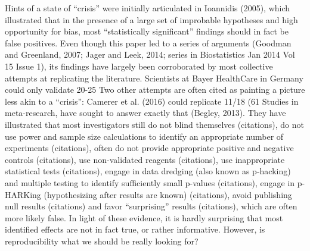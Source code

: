 \documentclass[12pt]{article}
\begin{document}
Hints of a state of “crisis” were initially articulated in Ioannidis (2005), which illustrated that in the presence of a large set of improbable hypotheses and high opportunity for bias, most “statistically significant” findings should in fact be false positives. Even though this paper led to a series of arguments (Goodman and Greenland, 2007; Jager and Leek, 2014; series in Biostatistics Jan 2014 Vol 15 Issue 1), its findings have largely been corroborated by most collective attempts at replicating the literature.
Scientists at Bayer HealthCare in Germany could only validate 20-25%
Two other attempts are often cited as painting a picture less akin to a “crisis”: Camerer et al. (2016) could replicate 11/18 (61%
Studies in meta-research, have sought to answer exactly that (Begley, 2013). They have illustrated that most investigators still do not blind themselves (citations), do not use power and sample size calculations to identify an appropriate number of experiments (citations), often do not provide appropriate positive and negative controls (citations), use non-validated reagents (citations), use inappropriate statistical tests (citations), engage in data dredging (also known as p-hacking) and multiple testing to identify sufficiently small p-values (citations), engage in p-HARKing (hypothesizing after results are known) (citations), avoid publishing null results (citations)  and favor “surprising” results (citations), which are often more likely false. In light of these evidence, it is hardly surprising that most identified effects are not in fact true, or rather informative. However, is reproducibility what we should be really looking for? 
\end{document}
